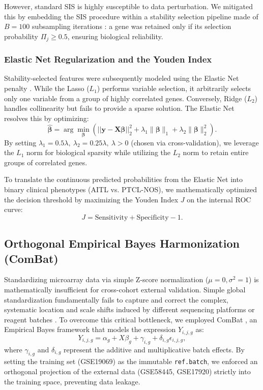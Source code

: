 \documentclass[a4paper,11pt,twocolumn]{article}
\begin{document}
	However, standard SIS is highly susceptible to data perturbation. We mitigated this by embedding the SIS procedure within a stability selection pipeline made of $B=100$ subsampling iterations \cite{Meinshausen2010}: a gene was retained only if its selection probability $\Pi_j \ge 0.5$, ensuring biological reliability.
	
	\subsubsection{Elastic Net Regularization and the Youden Index}
	Stability-selected features were subsequently modeled using the Elastic Net penalty \cite{Zou2005}. While the Lasso ($L_1$) performs variable selection, it arbitrarily selects only one variable from a group of highly correlated genes. Conversely, Ridge ($L_2$) handles collinearity but fails to provide a sparse solution. The Elastic Net resolves this by optimizing:
	$$ \hat{\boldsymbol{\beta}} = \arg\min_{\boldsymbol{\beta}} \left( ||\mathbf{y} - \mathbf{X}\boldsymbol{\beta}||_2^2 + \lambda_1 \|\boldsymbol{\beta}\|_1 + \lambda_2\|\boldsymbol{\beta}\|_2^2 \right). $$
	By setting $\lambda_1 = 0.5\lambda,\ \lambda_2=0.25\lambda,\ \lambda>0$ (chosen via cross-validation), we leverage the $L_1$ norm for biological sparsity while utilizing the $L_2$ norm to retain entire groups of correlated genes. 
	
	To translate the continuous predicted probabilities from the Elastic Net into binary clinical phenotypes (AITL vs. PTCL-NOS), we mathematically optimized the decision threshold by maximizing the Youden Index $J$ on the internal ROC curve:
	$$ J = \text{Sensitivity} + \text{Specificity} - 1.$$ 
	
	\subsection{Orthogonal Empirical Bayes Harmonization (ComBat)}
	Standardizing microarray data via simple Z-score normalization ($\mu=0, \sigma^2=1$) is mathematically insufficient for cross-cohort external validation. Simple global standardization fundamentally fails to capture and correct the complex, systematic location and scale shifts induced by different sequencing platforms or reagent batches \cite{Leek2010}. To overcome this critical bottleneck, we employed ComBat \cite{Johnson2007}, an Empirical Bayes framework that models the expression $Y_{i,j,g}$ as:
	$$ Y_{i,j,g} = \alpha_g + X \beta_g + \gamma_{i,g} + \delta_{i,g}\epsilon_{i,j,g}, $$
	where $\gamma_{i,g}$ and $\delta_{i,g}$ represent the additive and multiplicative batch effects. By setting the training set (GSE19069) as the immutable \texttt{ref.batch}, we enforced an orthogonal projection of the external data (GSE58445, GSE17920) strictly into the training space, preventing data leakage.
	
\end{document}
